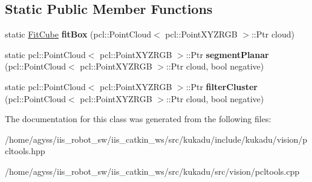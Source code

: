 \subsection*{Static Public Member Functions}
\begin{DoxyCompactItemize}
\item 
static \hyperlink{structkukadu_1_1FitCube}{Fit\+Cube} {\bfseries fit\+Box} (pcl\+::\+Point\+Cloud$<$ pcl\+::\+Point\+X\+Y\+Z\+R\+GB $>$\+::Ptr cloud)\hypertarget{classkukadu_1_1PCLTools_a1294a33f9577e78f8c562fd71ef8fd36}{}\label{classkukadu_1_1PCLTools_a1294a33f9577e78f8c562fd71ef8fd36}

\item 
static pcl\+::\+Point\+Cloud$<$ pcl\+::\+Point\+X\+Y\+Z\+R\+GB $>$\+::Ptr {\bfseries segment\+Planar} (pcl\+::\+Point\+Cloud$<$ pcl\+::\+Point\+X\+Y\+Z\+R\+GB $>$\+::Ptr cloud, bool negative)\hypertarget{classkukadu_1_1PCLTools_ace9796d5b9bf7bfcee964241139ec8bf}{}\label{classkukadu_1_1PCLTools_ace9796d5b9bf7bfcee964241139ec8bf}

\item 
static pcl\+::\+Point\+Cloud$<$ pcl\+::\+Point\+X\+Y\+Z\+R\+GB $>$\+::Ptr {\bfseries filter\+Cluster} (pcl\+::\+Point\+Cloud$<$ pcl\+::\+Point\+X\+Y\+Z\+R\+GB $>$\+::Ptr cloud, bool negative)\hypertarget{classkukadu_1_1PCLTools_afa121bf94ed33682e0ac825fb8be08cc}{}\label{classkukadu_1_1PCLTools_afa121bf94ed33682e0ac825fb8be08cc}

\end{DoxyCompactItemize}


The documentation for this class was generated from the following files\+:\begin{DoxyCompactItemize}
\item 
/home/agyss/iis\+\_\+robot\+\_\+sw/iis\+\_\+catkin\+\_\+ws/src/kukadu/include/kukadu/vision/pcltools.\+hpp\item 
/home/agyss/iis\+\_\+robot\+\_\+sw/iis\+\_\+catkin\+\_\+ws/src/kukadu/src/vision/pcltools.\+cpp\end{DoxyCompactItemize}
